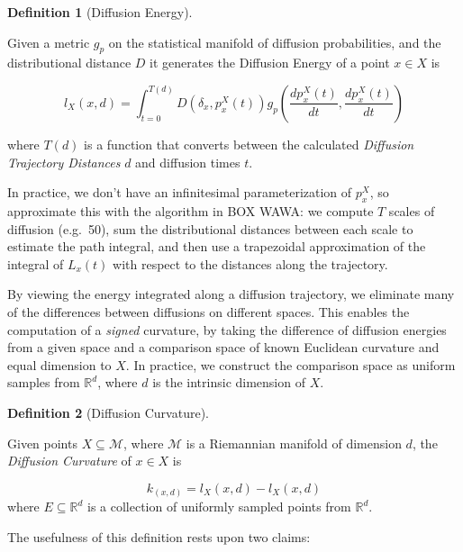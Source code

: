 \documentclass[
  letterpaper,
  DIV=11,
  numbers=noendperiod]{scrartcl}
\theoremstyle{plain}
\theoremstyle{plain}
\theoremstyle{definition}
\theoremstyle{plain}
\theoremstyle{definition}
\newtheorem{definition}{Definition}[section]
\theoremstyle{plain}
\theoremstyle{remark}
\begin{document}
\begin{definition}[Diffusion
Energy]\protect\hypertarget{def-diffusion-energy-path-integral}{}\label{def-diffusion-energy-path-integral}

Given a metric \(g_{p}\) on the statistical manifold of diffusion
probabilities, and the distributional distance \(D\) it generates the
Diffusion Energy of a point \(x \in X\) is

\[
l_{X}(x, d)= \int_{t=0}^{T(d)} D\left(\delta_x, p_x^X(t)\right) g_p\left(\frac{d p_x^X(t)}{d t}, \frac{ d p_x^X(t) }{d t} \right)
\]

where \(T(d)\) is a function that converts between the calculated
\emph{Diffusion Trajectory Distances} \(d\) and diffusion times \(t\).

\end{definition}

In practice, we don't have an infinitesimal parameterization of
\(p_{x}^X\), so approximate this with the algorithm in BOX WAWA: we
compute \(T\) scales of diffusion (e.g.~50), sum the distributional
distances between each scale to estimate the path integral, and then use
a trapezoidal approximation of the integral of \(L_{x}(t)\) with respect
to the distances along the trajectory.

By viewing the energy integrated along a diffusion trajectory, we
eliminate many of the differences between diffusions on different
spaces. This enables the computation of a \emph{signed} curvature, by
taking the difference of diffusion energies from a given space and a
comparison space of known Euclidean curvature and equal dimension to
\(X\). In practice, we construct the comparison space as uniform samples
from \(\mathbb{R}^d\), where \(d\) is the intrinsic dimension of \(X\).

\begin{definition}[Diffusion
Curvature]\protect\hypertarget{def-diffusion-curvature}{}\label{def-diffusion-curvature}

Given points \(X \subseteq \mathcal{M}\), where \(\mathcal{M}\) is a
Riemannian manifold of dimension \(d\), the \emph{Diffusion Curvature}
of \(x \in X\) is

\[
k_(x, d) = l_{X}(x, d) - l_{X}(x, d)
\] where \(E \subseteq \mathbb{R}^d\) is a collection of uniformly
sampled points from \(\mathbb{R}^d\).

\end{definition}

The usefulness of this definition rests upon two claims:
\end{document}
